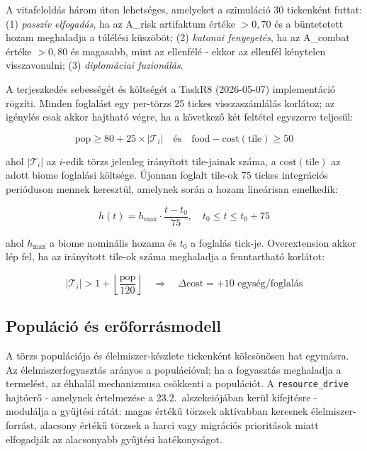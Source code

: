 ﻿\documentclass[a4paper,12pt]{report}
\begin{document}
A vitafeloldás három úton lehetséges, amelyeket a szimuláció 30 tickenként futtat: (1) \textit{passzív elfogadás}, ha az A\_risk artifaktum értéke $> 0{,}70$ és a büntetetett hozam meghaladja a túlélési küszöböt; (2) \textit{katonai fenyegetés}, ha az A\_combat értéke $> 0{,}80$ és magasabb, mint az ellenfélé - ekkor az ellenfél kénytelen visszavonulni; (3) \textit{diplomáciai fuzionálás}.

A terjeszkedés sebességét és költségét a TaskR8 (2026-05-07) implementáció rögzíti.
Minden foglalást egy per-törzs 25 tickes visszaszámlálás korlátoz; az igénylés csak
akkor hajtható végre, ha a következő két feltétel egyszerre teljesül:

\begin{equation}
\text{pop} \geq 80 + 25 \times |\mathcal{T}_i|
\quad \text{és} \quad
\text{food} - \text{cost}(\text{tile}) \geq 50
\end{equation}

ahol $|\mathcal{T}_i|$ az $i$-edik törzs jelenleg irányított tile-jainak száma,
a $\text{cost}(\text{tile})$ az adott biome foglalási költsége.
Újonnan foglalt tile-ok 75 tickes integrációs perióduson mennek keresztül,
amelynek során a hozam lineárisan emelkedik:

\begin{equation}
h(t) = h_{\max} \cdot \frac{t - t_0}{75}, \quad t_0 \leq t \leq t_0 + 75
\end{equation}

ahol $h_{\max}$ a biome nominális hozama és $t_0$ a foglalás tick-je.
Overextension akkor lép fel, ha az irányított tile-ok száma meghaladja
a fenntartható korlátot:

\begin{equation}
|\mathcal{T}_i| > 1 + \left\lfloor \frac{\text{pop}}{120} \right\rfloor
\quad \Rightarrow \quad \Delta\text{cost} = +10 \text{ egység/foglalás}
\end{equation}

\subsection*{Populáció és erőforrásmodell}

A törzs populációja és élelmiszer-készlete tickenként kölcsönösen hat egymásra. Az élelmiszerfogyasztás arányos a populációval; ha a fogyasztás meghaladja a termelést, az éhhalál mechanizmusa csökkenti a populációt. A \texttt{resource\_drive} hajtóerő - amelynek értelmezése a 23.2.~alszekciójában kerül kifejtésre - modulálja a gyűjtési rátát: magas értékű törzsek aktívabban keresnek élelmiszer-forrást, alacsony értékű törzsek a harci vagy migrációs prioritások miatt elfogadják az alacsonyabb gyűjtési hatékonyságot.
\end{document}
